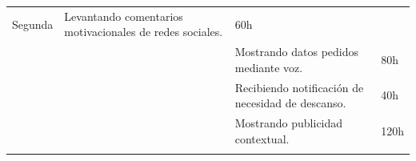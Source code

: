 \begin{longtable}[c]{@{}llll@{}}
\begin{minipage}[t]{0.12\columnwidth}
Segunda
\end{minipage} & \begin{minipage}[t]{0.58\columnwidth}\raggedright
Levantando comentarios motivacionales de redes sociales.
\end{minipage} & \begin{minipage}[t]{0.12\columnwidth}\raggedright
60h
\end{minipage}
\\\noalign{\medskip}
\begin{minipage}[t]{0.17\columnwidth}\raggedright
\end{minipage} & \begin{minipage}[t]{0.12\columnwidth}\raggedright
\end{minipage} & \begin{minipage}[t]{0.58\columnwidth}\raggedright
Mostrando datos pedidos mediante voz.
\end{minipage} & \begin{minipage}[t]{0.12\columnwidth}\raggedright
80h
\end{minipage}
\\\noalign{\medskip}
\begin{minipage}[t]{0.17\columnwidth}\raggedright
\end{minipage} & \begin{minipage}[t]{0.12\columnwidth}\raggedright
\end{minipage} & \begin{minipage}[t]{0.58\columnwidth}\raggedright
Recibiendo notificación de necesidad de descanso.
\end{minipage} & \begin{minipage}[t]{0.12\columnwidth}\raggedright
40h
\end{minipage}
\\\noalign{\medskip}
\begin{minipage}[t]{0.17\columnwidth}\raggedright
\end{minipage} & \begin{minipage}[t]{0.12\columnwidth}\raggedright
\end{minipage} & \begin{minipage}[t]{0.58\columnwidth}\raggedright
Mostrando publicidad contextual.
\end{minipage} & \begin{minipage}[t]{0.12\columnwidth}\raggedright
120h
\end{minipage}
\\\noalign{\medskip}
\begin{minipage}[t]{0.17\columnwidth}\raggedright

\end{minipage}
\end{longtable}
